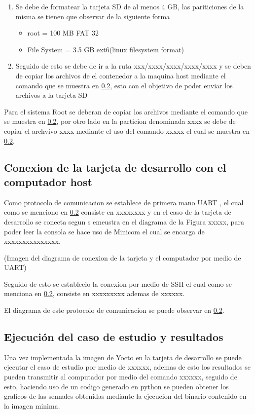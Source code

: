 \begin{enumerate}
    \item Se debe de formatear la tarjeta SD de al menos 4 GB, las pariticiones de la misma se tienen que observar de la siguiente forma 
    \begin{itemize}
        \item root = 100 MB FAT 32
        \item File System = 3.5 GB ext6(linux filesystem format)
        \end{itemize} 
    \item Seguido de esto se debe de ir a la ruta xxx/xxxx/xxxx/xxxx/xxxx y se deben de copiar los archivos de el contenedor a la maquina host mediante el comando que se muestra en \ref{}, esto con el objetivo de poder enviar los archivos a la tarjeta SD
\end{enumerate}

Para el sistema Root se deberan de copiar los archivos mediante el comando que se muestra en \ref{}, por otro lado en la particion denominada xxxx se debe de copiar el archvivo xxxx mediante el uso del comando xxxxx el cual se muestra en \ref{}.

\subsection{Conexion de la tarjeta de desarrollo con el computador host}

Como protocolo de comunicacion se establece de primera mano UART , el cual como se menciono en \ref{} consiste en xxxxxxxx y en el caso de la tarjeta de desarrollo se conecta segun s emeustra en el diagrama de la Figura xxxxx, para poder leer la consola se hace uso de Minicom el cual se encarga de xxxxxxxxxxxxxxx.

(Imagen del diagrama de conexion de la tarjeta y el computador por medio de UART)

Seguido de esto se establecio la conexion por medio de SSH el cual como se menciona en \ref{}, consiste en xxxxxxxxx ademas de xxxxxx. 

El diagrama de este protocolo de comunicacion se puede observar en \ref{}.


\subsection{Ejecución del caso de estudio y resultados}

Una vez implementada la imagen de Yocto en la tarjeta de desarrollo se puede ejecutar el caso de estudio por medio de xxxxxx, ademas de esto los resultados se pueden transmitir al computador por medio del comando xxxxxx, seguido de esto, haciendo uso de un codigo generado en python se pueden obtener los graficos de las sennales obtenidas mediante la ejecucion del binario contenido en la imagen minima.

